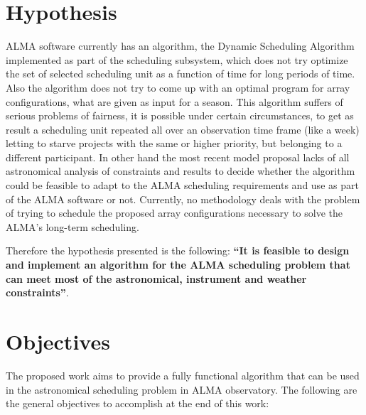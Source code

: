 \section{Hypothesis}

ALMA software currently has an algorithm, the Dynamic Scheduling Algorithm implemented as
part of the scheduling subsystem, which does not try optimize the set of selected scheduling unit
as a function of time for long periods of time. Also the algorithm does not try to come up with an
optimal program for array configurations, what are given as input for a season. This algorithm suffers of
serious problems of fairness, it is possible under certain circumstances, to get as result a
scheduling unit repeated all over an observation time frame (like a week) letting to starve
projects with the same or higher priority, but belonging to a different participant.
In other hand the most recent model proposal lacks of all astronomical analysis of constraints and
results to decide whether the algorithm could be feasible to adapt to the ALMA scheduling requirements
and use as part of the ALMA software or not.
Currently, no methodology deals with the problem of trying to schedule the proposed
array configurations necessary to solve the ALMA’s long-term scheduling.

Therefore the hypothesis presented is the following: \textbf{``It is feasible to design and implement an algorithm for the ALMA scheduling problem that can meet most of the astronomical, instrument and weather constraints''}.

\section{Objectives}
\label{sec:objectives}
The proposed work aims to provide a fully functional algorithm that can be used in the astronomical scheduling problem in ALMA observatory.
The following are the general objectives to accomplish at the end of this work:

